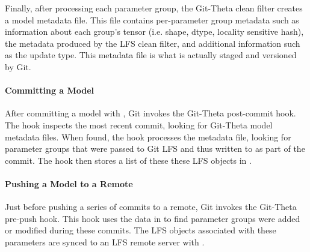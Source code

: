 Finally, after processing each parameter group, the Git-Theta clean filter creates a model metadata file. This file contains per-parameter group metadata such as information about each group's tensor (i.e. shape, dtype, locality sensitive hash), the metadata produced by the LFS clean filter, and additional information such as the update type. This metadata file is what is actually staged and versioned by Git.



\paragraph{Committing a Model}
After committing a model with , Git invokes the Git-Theta post-commit hook. The hook inspects the most recent commit, looking for Git-Theta model metadata files. When found, the hook processes the metadata file, looking for parameter groups that were passed to Git LFS and thus written to  as part of the commit. The hook then stores a list of these these LFS objects in .

\paragraph{Pushing a Model to a Remote}
Just before pushing a series of commits to a remote, Git invokes the Git-Theta pre-push hook. This hook uses the data in  to find parameter groups were added or modified during these commits. The LFS objects associated with these parameters are synced to an LFS remote server with .

